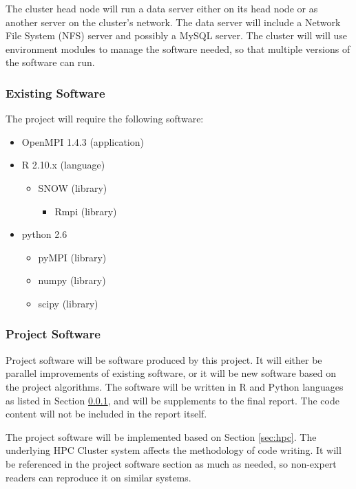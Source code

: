 The cluster head node will run a data server either on its head node or as 
another server on the cluster's network. The data server will include a 
Network File System (NFS) server and possibly a MySQL server. The cluster will 
will use environment modules to manage the software needed, so that multiple 
versions of the software can run. 


\pagebreak


\subsubsection{Existing Software}
\label{sec:esoftware}

The project will require the following software:
\begin{itemize}
	\item OpenMPI 1.4.3 (application)
	\item R 2.10.x (language)
	\begin{itemize}
		\item SNOW (library)
		\begin{itemize}
			\item Rmpi (library)
		\end{itemize}
	\end{itemize}
	\item python 2.6
	\begin{itemize}
		\item pyMPI (library)
		\item numpy (library)
		\item scipy (library)
	\end{itemize}
\end{itemize}

\subsubsection{Project Software}

Project software will be software produced by this project. It will either be
parallel improvements of existing software, or it will be new software based
on the project algorithms. The software will be written in R and Python 
languages as listed in Section \ref{sec:esoftware}, and will be 
supplements to the final report. The code content will not be included in the 
report itself.

The project software will be implemented based on Section \ref{sec:hpc}.
The underlying HPC Cluster system affects the methodology of code writing. It 
will be referenced in the project software section as much as needed, so 
non-expert readers can reproduce it on similar systems. 


